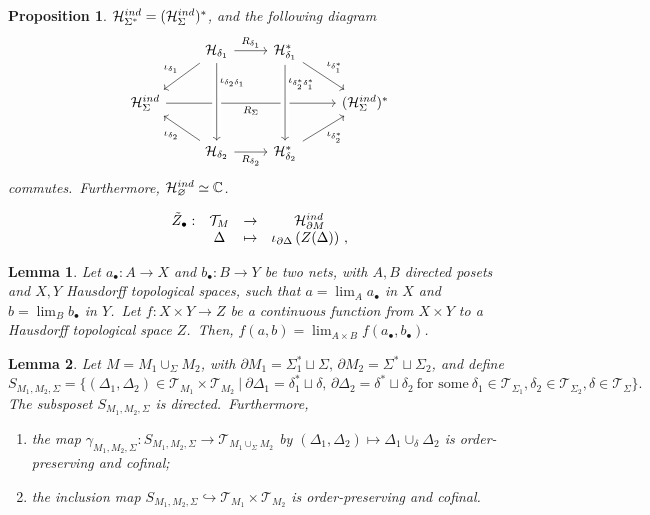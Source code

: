 \documentclass[10pt,a4paper]{amsart}
\newtheorem{proposition}{Proposition}
\newtheorem{lemma}{Lemma}
\newcommand{\C}{\mathbb{C}}
\newcommand{\Hil}{\mathcal{H}}
\newcommand{\del}{\partial}
\newcommand{\h}{\mathcal{H}}
\begin{document}
\begin{proposition}
\label{prop:dual}
    $\h_{\Sigma^*}^{\rm ind}= (\h_{\Sigma}^{\rm ind})^*$, and the following diagram
    \begin{equation}
    \label{dualcd}
    \begin{tikzcd} 
& \h_{\delta_1} \arrow{ld}[swap]{\iota_{\delta_1}} \arrow[r, "R_{\delta_1}"] &  \h_{\delta_1}^* \arrow[rd, "\iota_{\delta_1^*}"] & \\ 
      \h_{\Sigma}^{\rm ind} \arrow{rrr}[swap]{R_{\Sigma}}& & & (\h_{\Sigma}^{\rm ind})^*\\
       & \h_{\delta_2} \arrow[from=uu, crossing over, "\iota_{\delta_2\delta_1}" near start]\arrow[lu, "\iota_{\delta_2}"]\arrow{r}[swap]{R_{\delta_2}} &  \h_{\delta_2}^* \arrow{ru}[swap]{\iota_{\delta_2^*}} \arrow[from=uu, crossing over, "\iota_{\delta_2^*\delta_1^*}" near start]&  
    \end{tikzcd}
\end{equation}
commutes.~Furthermore, $\h_{\varnothing}^{\rm ind}\simeq \C$.
\end{proposition}

\begin{equation}
\label{eq:ind-net}
\begin{matrix}
    \tilde{Z}_\bullet:& \mathcal{T}_M &\to & \Hil^{\rm ind}_{\del M}\\
     & \Delta &\mapsto &\iota_{\del\Delta}\left(Z(\Delta)\right)\,,
\end{matrix}
\end{equation}

\begin{lemma}
\label{lem:contProd}
    Let $a_{\bullet}:A\to X$ and $b_{\bullet}:B\to Y$ be two nets, with $A,B$ directed posets and $X,Y$ Hausdorff topological spaces, such that $a=\lim_A a_{\bullet}$ in $X$ and $b=\lim_B b_{\bullet}$ in $Y$.~Let $f:X\times Y\to Z$ be a continuous function from $X\times Y$ to a Hausdorff topological space $Z$.~Then, $f(a,b)=\lim_{A\times B}f(a_{\bullet},b_{\bullet})$.
\end{lemma}

\begin{lemma}
    \label{lem:cutsubnet}
    Let $M=M_1\cup_{\Sigma}M_2$, with $\partial M_1=\Sigma^*_1\sqcup\Sigma,\,\del M_2=\Sigma^*\sqcup\Sigma_2$, and define
    $$
    S_{M_1,M_2,\Sigma}=\{(\Delta_1,\Delta_2)\in\mathcal{T}_{M_1}\times\mathcal{T}_{M_2}\ |\ \partial\Delta_1=\delta_1^*\sqcup\delta,\,\partial\Delta_2=\delta^*\sqcup\delta_2\  \text{for some}\ \delta_1\in\mathcal{T}_{\Sigma_1},\delta_2\in\mathcal{T}_{\Sigma_2},\delta\in\mathcal{T}_{\Sigma}\}.
    $$
    The subsposet $S_{M_1,M_2,\Sigma}$ is directed.~Furthermore,
    \begin{enumerate}
        \item the map $\gamma_{M_1,M_2,\Sigma}:S_{M_1,M_2,\Sigma}\to\mathcal{T}_{M_1\cup_{\Sigma}M_2}$ by $(\Delta_1,\Delta_2)\mapsto\Delta_1\cup_{\delta}\Delta_2$ is order-preserving and cofinal;
        \item the inclusion map $S_{M_1,M_2,\Sigma}\hookrightarrow\mathcal{T}_{M_1}\times\mathcal{T}_{M_2}$ is order-preserving and cofinal.
    \end{enumerate}
\end{lemma}
\end{document}
